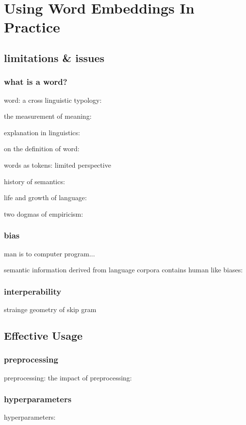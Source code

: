 \chapter{Using Word Embeddings In Practice}\label{chapter:using-word-embeddings}
\section{limitations \& issues}
\subsection{what is a word?}
word: a cross linguistic typology:~\cite{dixon02_word}

the measurement of meaning:~\cite{osgood_57_the_meas_of_mean}

explanation in linguistics:~\cite{egr_2015_explan_in_ling}

on the definition of word:~\cite{carstairs_1989_on_the_def_of}

words as tokens: limited perspective~\cite{kaplan_1990_words}

history of semantics:~\cite{riemer_2015_routledge}

life and growth of language:~\cite{whitney_1875_life}

two dogmas of empiricism:~\cite{quine_1951_main_trends}

\subsection{bias}
man is to computer program...~\cite{bolukbasi16_man_is_to_comput_progr}

semantic information derived from language corpora contains human like biases:~\cite{caliskan17_seman_deriv_autom_from_languag}

\subsection{interperability}
strainge geometry of skip gram~\cite{mimno-thompson-2017-strange}

\section{Effective Usage}
\subsection{preprocessing}
preprocessing:
the impact of preprocessing:~\cite{uysal_2014_the_impact_of_preprocessing}
\subsection{hyperparameters}
hyperparameters:~\cite{lai-2015-how-gener-good-word-embed}

